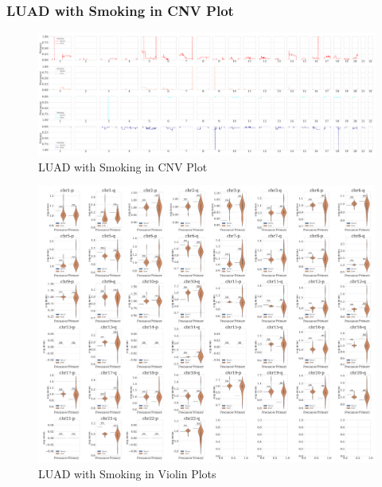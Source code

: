 \documentclass{beamer}
\begin{document}
    \begin{frame}[allowframebreaks]
        \frametitle{LUAD with Smoking in CNV Plot}

        \begin{figure}
            \includegraphics[width=\linewidth]{figures/PureCN/BWA-simple-ADC.Smoking.pdf}
            \caption{LUAD with Smoking in CNV Plot}
        \end{figure}

        \begin{figure}
            \includegraphics[width=0.7 \linewidth]{figures/PureCN/BWA-violin-ADC.Smoking.pdf}
            \caption{LUAD with Smoking in Violin Plots}
        \end{figure}
    \end{frame}
\end{document}
